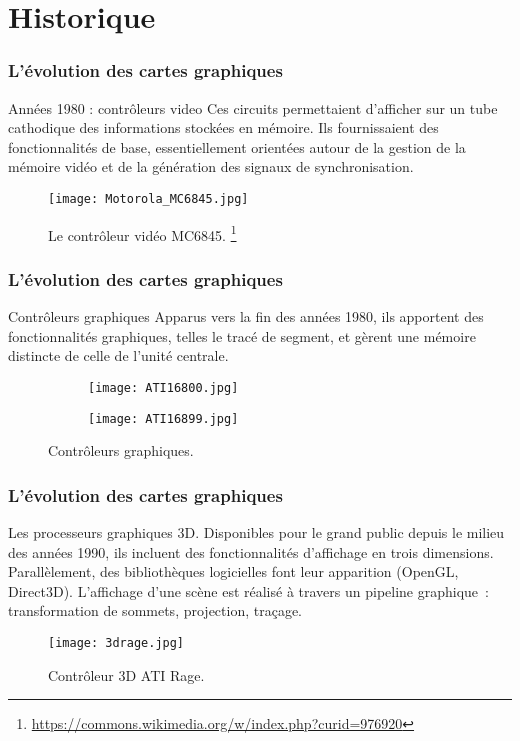 \section{Historique}
\begin{frame}
    \frametitle{L'évolution des cartes graphiques}
\begin{block}{Années 1980 : contrôleurs video}
  Ces circuits permettaient d'afficher sur un tube cathodique 
  des informations stockées en mémoire. Ils fournissaient des fonctionnalités de base, essentiellement orientées
  autour de la gestion de la mémoire vidéo et de la génération des signaux de synchronisation. 
  \begin{figure}[ht]
    \centering
    \texttt{[image: Motorola\_MC6845.jpg]}
    \caption{Le contrôleur vidéo MC6845. \footnote{\tiny \url{https://commons.wikimedia.org/w/index.php?curid=976920}}}
    \label{fig:MC6845}
  \end{figure}
\end{block}
\end{frame}
\begin{frame}
  \frametitle{L'évolution des cartes graphiques}
\begin{block}{Contrôleurs graphiques}
  Apparus vers la fin des années 1980, ils apportent des fonctionnalités graphiques, telles le tracé de segment, 
  et gèrent une mémoire distincte de celle de l'unité centrale.
   \begin{figure}[htbp]
    \centering
    \hfill
   \begin{subfigure}{0.4\textwidth}
    \texttt{[image: ATI16800.jpg]}
   \end{subfigure} 
   \hfill
   \begin{subfigure}{0.4\textwidth}
    \texttt{[image: ATI16899.jpg]}
   \end{subfigure} 
   \hfill
    \caption{Contrôleurs graphiques.}
    \label{fig:graphic_controllers}
   \end{figure}
\end{block}
\end{frame}
\begin{frame}
  \frametitle{L'évolution des cartes graphiques}
\begin{block}{Les processeurs graphiques 3D.}
    Disponibles pour le grand public depuis le milieu des années 1990, ils incluent des fonctionnalités
    d'affichage en trois dimensions. Parallèlement, des bibliothèques logicielles font leur apparition
    (OpenGL, Direct3D). L'affichage d'une scène est réalisé à travers un pipeline graphique~: 
    transformation de sommets, projection, traçage.
    \begin{figure}[htbp]
        \centering
       \texttt{[image: 3drage.jpg]} 
        \caption{Contrôleur 3D ATI Rage.}
        \label{fig:ati_rage}
    \end{figure}
\end{block}
\end{frame}
